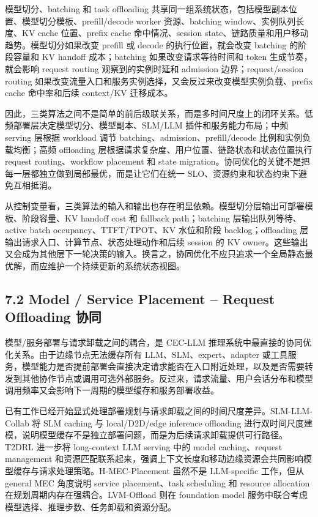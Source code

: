 模型切分、batching 和 task offloading 共享同一组系统状态，包括模型副本位置、模型切分模板、prefill/decode worker 资源、batching window、实例队列长度、KV cache 位置、prefix cache 命中情况、session state、链路质量和用户移动趋势。模型切分如果改变 prefill 或 decode 的执行位置，就会改变 batching 的阶段容量和 KV handoff 成本；batching 如果改变请求等待时间和 token 生成节奏，就会影响 request routing 观察到的实例时延和 admission 边界；request/session routing 如果改变流量入口和服务实例选择，又会反过来改变模型实例负载、prefix cache 命中率和后续 context/KV 迁移成本。

因此，三类算法之间不是简单的前后级联关系，而是多时间尺度上的闭环关系。低频部署层决定模型切分、模型副本、SLM/LLM 插件和服务能力布局；中频 serving 层根据 workload 调节 batching、admission、prefill/decode 比例和实例负载均衡；高频 offloading 层根据请求复杂度、用户位置、链路状态和状态位置执行 request routing、workflow placement 和 state migration。协同优化的关键不是把每一层都独立做到局部最优，而是让它们在统一 SLO、资源约束和状态约束下避免互相抵消。

从控制变量看，三类算法的输入和输出也存在明显依赖。模型切分层输出可部署模板、阶段容量、KV handoff cost 和 fallback path；batching 层输出队列等待、active batch occupancy、TTFT/TPOT、KV 水位和阶段 backlog；offloading 层输出请求入口、计算节点、状态处理动作和后续 session 的 KV owner。这些输出又会成为其他层下一轮决策的输入。换言之，协同优化不应只追求一个全局静态最优解，而应维护一个持续更新的系统状态视图。


\subsection*{7.2 Model / Service Placement -- Request Offloading 协同}

模型/服务部署与请求卸载之间的耦合，是 CEC-LLM 推理系统中最直接的协同优化关系。由于边缘节点无法缓存所有 LLM、SLM、expert、adapter 或工具服务，模型能力是否提前部署会直接决定请求能否在入口附近处理，以及是否需要转发到其他协作节点或调用可选外部服务。反过来，请求流量、用户会话分布和模型调用频率又会影响下一周期的模型缓存和服务部署收益。

已有工作已经开始显式处理部署规划与请求卸载之间的时间尺度差异。SLM-LLM-Collab \cite{xu2025joint} 将 SLM caching 与 local/D2D/edge inference offloading 进行双时间尺度建模，说明模型缓存不是独立部署问题，而是为后续请求卸载提供可行路径。T2DRL \cite{xu2026serving} 进一步将 long-context LLM serving 中的 model caching、request management 和资源匹配联系起来，强调上下文长度和移动边缘资源会共同影响模型缓存与请求处理策略。H-MEC-Placement \cite{du2025online} 虽然不是 LLM-specific 工作，但从 general MEC 角度说明 service placement、task scheduling 和 resource allocation 在规划周期内存在强耦合。LVM-Offload \cite{zhuang2025joint} 则在 foundation model 服务中联合考虑模型选择、推理步数、任务卸载和资源分配。

